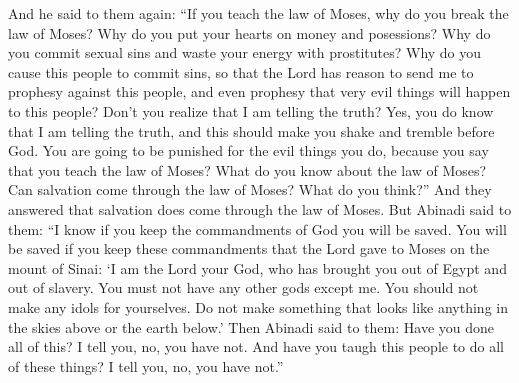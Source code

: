 And he said to them again: ``If you teach the law of Moses, why do you break the law of Moses? Why do you put your hearts on money and posessions? Why do you commit sexual sins and waste your energy with prostitutes? Why do you cause this people to commit sins, so that the Lord has reason to send me to prophesy against this people, and even prophesy that very evil things will happen to this people?
\bverse \iffalse Know ye not that I speak the truth? Yea, ye know that I speak the truth; and you ought to tremble before God. \fi
Don't you realize that I am telling the truth? Yes, you do know that I am telling the truth, and this should make you shake and tremble before God.
\bverse \iffalse And it shall come to pass that ye shall be smitten for your iniquities, for ye have said that ye teach the law of Moses. And what know ye concerning the law of Moses? Doth salvation come by the law of Moses? What say ye? \fi
You are going to be punished for the evil things you do, because you say that you teach the law of Moses? What do you know about the law of Moses? Can salvation come through the law of Moses? What do you think?''
\bverse \iffalse And they answered and said that salvation did come by the law of Moses. \fi
And they answered that salvation does come through the law of Moses.
\bverse \iffalse But now Abinadi said unto them: I know if ye keep the commandments of God ye shall be saved; yea, if ye keep the commandments which the Lord delivered unto Moses in the mount of Sinai, saying: \fi
But Abinadi said to them: ``I know if you keep the commandments of God you will be saved. You will be saved if you keep these commandments that the Lord gave to Moses on the mount of Sinai:
\bverse \iffalse I am the Lord thy God, who hath brought thee out of the land of Egypt, out of the house of bondage. \fi
\lq I am the Lord your God, who has brought you out of Egypt and out of slavery.
\bverse \iffalse Thou shalt have no other God before me. \fi
You must not have any other gods except me.
\bverse \iffalse Thou shalt not make unto thee any graven image, or any likeness of any thing in heaven above, or things which are in the earth beneath. \fi
You should not make any idols for yourselves. Do not make something that looks like anything in the skies above or the earth below.\rq
\bverse \iffalse Now Abinadi said unto them, Have ye done all this? I say unto you, Nay, ye have not. And have ye taught this people that they should do all these things? I say unto you, Nay, ye have not. \fi
Then Abinadi said to them: Have you done all of this? I tell you, no, you have not. And have you taugh this people to do all of these things? I tell you, no, you have not.''

